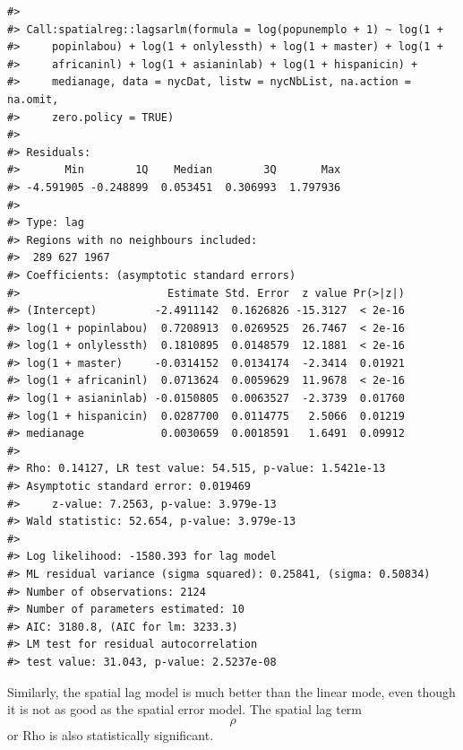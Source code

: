 \documentclass[
  11pt,
]{book}
\newenvironment{Shaded}{\begin{snugshade}}{\end{snugshade}}
\newcommand{\AttributeTok}[1]{\textcolor[rgb]{0.77,0.63,0.00}{#1}}
\newcommand{\CommentTok}[1]{\textcolor[rgb]{0.56,0.35,0.01}{\textit{#1}}}
\newcommand{\ConstantTok}[1]{\textcolor[rgb]{0.00,0.00,0.00}{#1}}
\newcommand{\DecValTok}[1]{\textcolor[rgb]{0.00,0.00,0.81}{#1}}
\newcommand{\FunctionTok}[1]{\textcolor[rgb]{0.00,0.00,0.00}{#1}}
\newcommand{\NormalTok}[1]{#1}
\newcommand{\OtherTok}[1]{\textcolor[rgb]{0.56,0.35,0.01}{#1}}
\newcommand{\SpecialCharTok}[1]{\textcolor[rgb]{0.00,0.00,0.00}{#1}}
\begin{document}
\begin{verbatim}
#> 
#> Call:spatialreg::lagsarlm(formula = log(popunemplo + 1) ~ log(1 + 
#>     popinlabou) + log(1 + onlylessth) + log(1 + master) + log(1 + 
#>     africaninl) + log(1 + asianinlab) + log(1 + hispanicin) + 
#>     medianage, data = nycDat, listw = nycNbList, na.action = na.omit, 
#>     zero.policy = TRUE)
#> 
#> Residuals:
#>       Min        1Q    Median        3Q       Max 
#> -4.591905 -0.248899  0.053451  0.306993  1.797936 
#> 
#> Type: lag 
#> Regions with no neighbours included:
#>  289 627 1967 
#> Coefficients: (asymptotic standard errors) 
#>                       Estimate Std. Error  z value Pr(>|z|)
#> (Intercept)         -2.4911142  0.1626826 -15.3127  < 2e-16
#> log(1 + popinlabou)  0.7208913  0.0269525  26.7467  < 2e-16
#> log(1 + onlylessth)  0.1810895  0.0148579  12.1881  < 2e-16
#> log(1 + master)     -0.0314152  0.0134174  -2.3414  0.01921
#> log(1 + africaninl)  0.0713624  0.0059629  11.9678  < 2e-16
#> log(1 + asianinlab) -0.0150805  0.0063527  -2.3739  0.01760
#> log(1 + hispanicin)  0.0287700  0.0114775   2.5066  0.01219
#> medianage            0.0030659  0.0018591   1.6491  0.09912
#> 
#> Rho: 0.14127, LR test value: 54.515, p-value: 1.5421e-13
#> Asymptotic standard error: 0.019469
#>     z-value: 7.2563, p-value: 3.979e-13
#> Wald statistic: 52.654, p-value: 3.979e-13
#> 
#> Log likelihood: -1580.393 for lag model
#> ML residual variance (sigma squared): 0.25841, (sigma: 0.50834)
#> Number of observations: 2124 
#> Number of parameters estimated: 10 
#> AIC: 3180.8, (AIC for lm: 3233.3)
#> LM test for residual autocorrelation
#> test value: 31.043, p-value: 2.5237e-08
\end{verbatim}

Similarly, the spatial lag model is much better than the linear mode, even though it is not as good as the spatial error model. The spatial lag term \[\rho\] or Rho is also statistically significant.

\begin{Shaded}
\end{Shaded}
\end{document}
